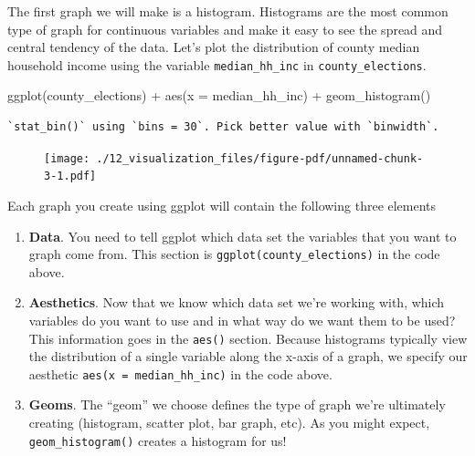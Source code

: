 \documentclass[
  letterpaper,
]{book}
\newenvironment{Shaded}{\begin{snugshade}}{\end{snugshade}}
\newcommand{\AttributeTok}[1]{\textcolor[rgb]{0.40,0.45,0.13}{#1}}
\newcommand{\FunctionTok}[1]{\textcolor[rgb]{0.28,0.35,0.67}{#1}}
\newcommand{\NormalTok}[1]{\textcolor[rgb]{0.00,0.23,0.31}{#1}}
\newcommand{\SpecialCharTok}[1]{\textcolor[rgb]{0.37,0.37,0.37}{#1}}
\providecommand{\tightlist}{%
  \setlength{\itemsep}{0pt}\setlength{\parskip}{0pt}}\usepackage{longtable,booktabs,array}
\theoremstyle{definition}
\theoremstyle{definition}
\theoremstyle{plain}
\theoremstyle{definition}
\theoremstyle{plain}
\theoremstyle{plain}
\theoremstyle{remark}
\begin{document}
The first graph we will make is a histogram. Histograms are the most
common type of graph for continuous variables and make it easy to see
the spread and central tendency of the data. Let's plot the distribution
of county median household income using the variable
\texttt{median\_hh\_inc} in \texttt{county\_elections}.

\begin{Shaded}
\begin{Highlighting}[]
\FunctionTok{ggplot}\NormalTok{(county\_elections) }\SpecialCharTok{+}
  \FunctionTok{aes}\NormalTok{(}\AttributeTok{x =}\NormalTok{ median\_hh\_inc) }\SpecialCharTok{+}
  \FunctionTok{geom\_histogram}\NormalTok{()}
\end{Highlighting}
\end{Shaded}

\begin{verbatim}
`stat_bin()` using `bins = 30`. Pick better value with `binwidth`.
\end{verbatim}

\begin{figure}[H]

{\centering \texttt{[image: ./12\_visualization\_files/figure-pdf/unnamed-chunk-3-1.pdf]}

}

\end{figure}

Each graph you create using ggplot will contain the following three
elements

\begin{enumerate}
\def\labelenumi{\arabic{enumi}.}
\tightlist
\item
  \textbf{Data}. You need to tell ggplot which data set the variables
  that you want to graph come from. This section is
  \texttt{ggplot(county\_elections)} in the code above.
\item
  \textbf{Aesthetics}. Now that we know which data set we're working
  with, which variables do you want to use and in what way do we want
  them to be used? This information goes in the \texttt{aes()} section.
  Because histograms typically view the distribution of a single
  variable along the x-axis of a graph, we specify our aesthetic
  \texttt{aes(x\ =\ median\_hh\_inc)} in the code above.
\item
  \textbf{Geoms}. The ``geom'' we choose defines the type of graph we're
  ultimately creating (histogram, scatter plot, bar graph, etc). As you
  might expect, \texttt{geom\_histogram()} creates a histogram for us!
\end{enumerate}
\end{document}
